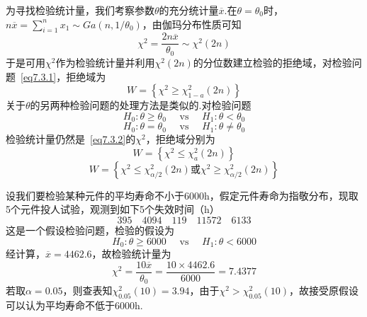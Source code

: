 为寻找检验统计量，我们考察参数$\theta$的充分统计量$\overline { x }$.在$\theta=\theta_{ 0 }$时，$n \overline { x } = \sum _ { i = 1 } ^ { n } x _ { 1 } \sim G a \left( n , 1 / \theta _ { 0 } \right)$，由伽玛分布性质可知
\begin{equation}\label{eq7.3.2}
\chi ^ { 2 } = \frac { 2 n \overline { x } } { \theta _ { 0 } } \sim \chi ^ { 2 } ( 2 n )
\end{equation}
于是可用$\chi ^ { 2 }$作为检验统计量并利用$\chi ^ { 2 }(2n)$的分位数建立检验的拒绝域，对检验问题~\ref{eq7.3.1}，拒绝域为
\begin{equation}\label{eq7.3.3}
W = \left\{ \chi ^ { 2 } \geq \chi _ { 1 - a } ^ { 2 } ( 2 n ) \right\}
\end{equation}
关于$\theta$的另两种检验问题的处理方法是类似的.对检验问题
\begin{equation}\label{eq7.3.4}
H _ { 0 } : \theta \geq \theta _ { 0 } \quad \text { vs } \quad H _ { 1 } : \theta < \theta _ { 0 }
\end{equation}
\begin{equation}\label{eq7.3.5}
H _ { 0 } : \theta = \theta _ { 0 } \quad \text { vs } \quad H _ { 1 } : \theta \ne  \theta _ { 0 }
\end{equation}
检验统计量仍然是~\ref{eq7.3.2}的$\chi ^ { 2 }$，拒绝域分别为
\begin{equation}\label{eq7.3.6}
W = \left\{ \chi ^ { 2 } \leq \chi _ { a } ^ { 2 } ( 2 n ) \right\}
\end{equation}
\begin{equation}\label{eq7.3.7}
W=\left\{\chi^2\leq\chi_{\alpha/2}^{2}\left(2n\right)\textrm{或}\chi^2\geq\chi_{\alpha/2}^{2}\left(2n\right)\right\}
\end{equation}
\begin{example}\label{exam7.3.1}
	设我们要检验某种元件的平均寿命不小于6000h，假定元件寿命为指敬分布，现取5个元件投人试验，观测到如下5个失效时间（h）
	\[395 \quad 4094 \quad 119 \quad 11572 \quad 6133\]
	这是一个假设检验问题，检验的假设为
	\[H _ { 0 } : \theta \geq 6000 \quad \text { vs } \quad H _ { 1 } : \theta < 6000\]
	经计算，$\overline{ x }=4462.6$，故检验统计量为
	\[\chi ^ { 2 } = \frac { 10 \overline { x } } { \theta _ { 0 } } = \frac { 10 \times 4462.6 } { 6000 } = 7.4377\]
	若取$\alpha = 0.05$，则查表知$\chi _ { 0.05 } ^ { 2 } ( 10 ) = 3.94$，由于$\chi^{2}>\chi _ { 0.05 } ^ { 2 } ( 10 ) $，故接受原假设可以认为平均寿命不低于6000h.
\end{example}
